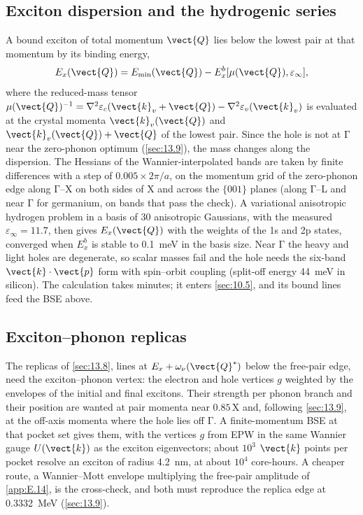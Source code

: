 \subsection{Exciton dispersion and the hydrogenic series}

A bound exciton of total momentum $\vect{Q}$ lies below the lowest pair at that momentum by its binding energy,
\begin{equation}
  E_x(\vect{Q}) = E_{\mathrm{min}}(\vect{Q}) - E_x^b[\mu(\vect{Q}),\varepsilon_\infty] ,
  \label{eq:E.15-disp}
\end{equation}
where the reduced-mass tensor $\mu(\vect{Q})^{-1} = \nabla^2\varepsilon_c(\vect{k}_v+\vect{Q}) - \nabla^2\varepsilon_v(\vect{k}_v)$ is evaluated at the crystal momenta $\vect{k}_v(\vect{Q})$ and $\vect{k}_v(\vect{Q})+\vect{Q}$ of the lowest pair. Since the hole is not at $\mathrm{\Gamma}$ near the zero-phonon optimum (\cref{sec:13.9}), the mass changes along the dispersion. The Hessians of the Wannier-interpolated bands are taken by finite differences with a step of $0.005\times2\pi/a$, on the momentum grid of the zero-phonon edge along $\mathrm{\Gamma}$--X on both sides of X and across the $\{001\}$ planes (along $\mathrm{\Gamma}$--L and near $\mathrm{\Gamma}$ for germanium, on bands that pass the check). A variational anisotropic hydrogen problem in a basis of 30 anisotropic Gaussians, with the measured $\varepsilon_\infty = 11.7$, then gives $E_x(\vect{Q})$ with the weights of the 1s and 2p states, converged when $E_x^b$ is stable to \SI{0.1}{meV} in the basis size. Near $\mathrm{\Gamma}$ the heavy and light holes are degenerate, so scalar masses fail and the hole needs the six-band $\vect{k}\cdot\vect{p}$ form with spin--orbit coupling (split-off energy \SI{44}{meV} in silicon). The calculation takes minutes; it enters \cref{sec:10.5}, and its bound lines feed the BSE above.

\subsection{Exciton--phonon replicas}

The replicas of \cref{sec:13.8}, lines at $E_x + \omega_\nu(\vect{Q}^*)$ below the free-pair edge, need the exciton--phonon vertex: the electron and hole vertices $g$ weighted by the envelopes of the initial and final excitons. Their strength per phonon branch and their position are wanted at pair momenta near $0.85\,\mathrm{X}$ and, following \cref{sec:13.9}, at the off-axis momenta where the hole lies off $\mathrm{\Gamma}$. A finite-momentum BSE at that pocket set gives them, with the vertices $g$ from EPW in the same Wannier gauge $U(\vect{k})$ as the exciton eigenvectors; about $10^3$ $\vect{k}$ points per pocket resolve an exciton of radius \SI{4.2}{nm}, at about $10^4$ core-hours. A cheaper route, a Wannier--Mott envelope multiplying the free-pair amplitude of \cref{app:E.14}, is the cross-check, and both must reproduce the replica edge at \SI{0.3332}{MeV} (\cref{sec:13.9}).

